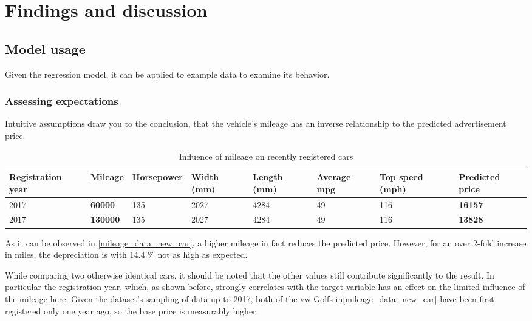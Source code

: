 \chapter{Findings and discussion}
\section{Model usage}
Given the regression model, it can be applied to example data to examine its behavior.
\subsection{Assessing expectations}
Intuitive assumptions draw you to the conclusion, that the vehicle's mileage has an inverse relationship to the predicted advertisement price.
\begin{table}[H]
    \begin{adjustbox}{width={\textwidth}}
        \begin{tabular}{|l|l|l|l|l|l|l|l|}
            \hline
            Registration year & \textbf{Mileage} & Horsepower & Width (mm) & Length (mm) & Average mpg & Top speed (mph) & \textbf{Predicted price} \\ \hline
            2017              & \textbf{60000}   & 135        & 2027       & 4284        & 49          & 116             & \textbf{16157}           \\\hline
            2017              & \textbf{130000}  & 135        & 2027       & 4284        & 49          & 116             & \textbf{13828}           \\\hline
        \end{tabular}
    \end{adjustbox}
    \caption{Influence of mileage on recently registered cars}
    \label{mileage_data_new_car}
\end{table}
As it can be observed in \autoref{mileage_data_new_car}, a higher mileage in fact reduces the predicted price.
However, for an over 2-fold increase in miles, the depreciation is with 14.4 \% not as high as expected.
\par
While comparing two otherwise identical cars, it should be noted that the other values still contribute significantly to the
result.
\newline
In particular the registration year, which, as shown before, strongly correlates with the target variable has an effect on the limited
influence of the mileage here.
Given the dataset's sampling of data up to 2017, both of the \ac{vw} Golfs in\autoref{mileage_data_new_car} have been first registered only one year ago, so the base price is measurably higher.
